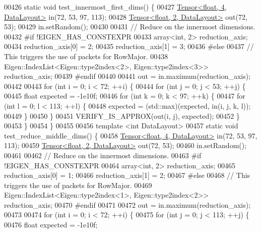 \begin{DoxyCode}
00426 \textcolor{keyword}{static} \textcolor{keywordtype}{void} test\_innermost\_first\_dims() \{
00427   \hyperlink{class_eigen_1_1_tensor}{Tensor<float, 4, DataLayout>} in(72, 53, 97, 113);
00428   \hyperlink{class_eigen_1_1_tensor}{Tensor<float, 2, DataLayout>} out(72, 53);
00429   in.setRandom();
00430 
00431 \textcolor{comment}{// Reduce on the innermost dimensions.}
00432 \textcolor{preprocessor}{#if !EIGEN\_HAS\_CONSTEXPR}
00433   array<int, 2> reduction\_axis;
00434   reduction\_axis[0] = 2;
00435   reduction\_axis[1] = 3;
00436 \textcolor{preprocessor}{#else}
00437   \textcolor{comment}{// This triggers the use of packets for RowMajor.}
00438   Eigen::IndexList<Eigen::type2index<2>, Eigen::type2index<3>> reduction\_axis;
00439 \textcolor{preprocessor}{#endif}
00440 
00441   out = in.maximum(reduction\_axis);
00442 
00443   \textcolor{keywordflow}{for} (\textcolor{keywordtype}{int} i = 0; i < 72; ++i) \{
00444     \textcolor{keywordflow}{for} (\textcolor{keywordtype}{int} j = 0; j < 53; ++j) \{
00445       \textcolor{keywordtype}{float} expected = -1e10f;
00446       \textcolor{keywordflow}{for} (\textcolor{keywordtype}{int} k = 0; k < 97; ++k) \{
00447         \textcolor{keywordflow}{for} (\textcolor{keywordtype}{int} l = 0; l < 113; ++l) \{
00448           expected = (std::max)(expected, in(i, j, k, l));
00449         \}
00450       \}
00451       VERIFY\_IS\_APPROX(out(i, j), expected);
00452     \}
00453   \}
00454 \}
00455 
00456 \textcolor{keyword}{template} <\textcolor{keywordtype}{int} DataLayout>
00457 \textcolor{keyword}{static} \textcolor{keywordtype}{void} test\_reduce\_middle\_dims() \{
00458   \hyperlink{class_eigen_1_1_tensor}{Tensor<float, 4, DataLayout>} in(72, 53, 97, 113);
00459   \hyperlink{class_eigen_1_1_tensor}{Tensor<float, 2, DataLayout>} out(72, 53);
00460   in.setRandom();
00461 
00462 \textcolor{comment}{// Reduce on the innermost dimensions.}
00463 \textcolor{preprocessor}{#if !EIGEN\_HAS\_CONSTEXPR}
00464   array<int, 2> reduction\_axis;
00465   reduction\_axis[0] = 1;
00466   reduction\_axis[1] = 2;
00467 \textcolor{preprocessor}{#else}
00468   \textcolor{comment}{// This triggers the use of packets for RowMajor.}
00469   Eigen::IndexList<Eigen::type2index<1>, Eigen::type2index<2>> reduction\_axis;
00470 \textcolor{preprocessor}{#endif}
00471 
00472   out = in.maximum(reduction\_axis);
00473 
00474   \textcolor{keywordflow}{for} (\textcolor{keywordtype}{int} i = 0; i < 72; ++i) \{
00475     \textcolor{keywordflow}{for} (\textcolor{keywordtype}{int} j = 0; j < 113; ++j) \{
00476       \textcolor{keywordtype}{float} expected = -1e10f;

\end{DoxyCode}
